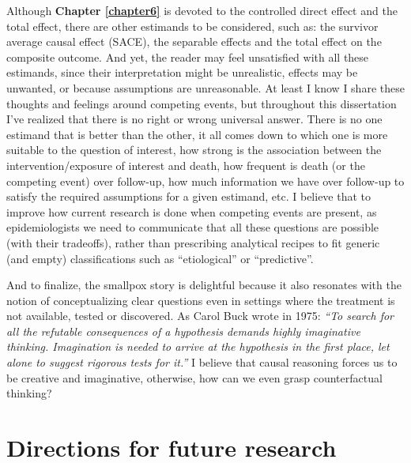 \documentclass[
]{book}
\begin{document}
Although \textbf{Chapter \ref{chapter6}} is devoted to the controlled direct effect and the total effect, there are other estimands to be considered, such as: the survivor average causal effect (SACE)\autocite{frangakis2002}, the separable effects\autocite{stensrud2020} and the total effect on the composite outcome. And yet, the reader may feel unsatisfied with all these estimands, since their interpretation might be unrealistic, effects may be unwanted, or because assumptions are unreasonable. At least I know I share these thoughts and feelings around competing events, but throughout this dissertation I've realized that there is no right or wrong universal answer. There is no one estimand that is better than the other, it all comes down to which one is more suitable to the question of interest, how strong is the association between the intervention/exposure of interest and death, how frequent is death (or the competing event) over follow-up, how much information we have over follow-up to satisfy the required assumptions for a given estimand, etc. I believe that to improve how current research is done when competing events are present, as epidemiologists we need to communicate that all these questions are possible (with their tradeoffs), rather than prescribing analytical recipes to fit generic (and empty) classifications such as ``etiological'' or ``predictive''.

And to finalize, the smallpox story is delightful because it also resonates with the notion of conceptualizing clear questions even in settings where the treatment is not available, tested or discovered. As Carol Buck wrote in 1975: \emph{``To search for all the refutable consequences of a hypothesis demands highly imaginative thinking. Imagination is needed to arrive at the hypothesis in the first place, let alone to suggest rigorous tests for it.''} I believe that causal reasoning forces us to be creative and imaginative, otherwise, how can we even grasp counterfactual thinking?

\newpage

\hypertarget{directions-for-future-research}{%
\section{Directions for future research}\label{directions-for-future-research}}
\end{document}
